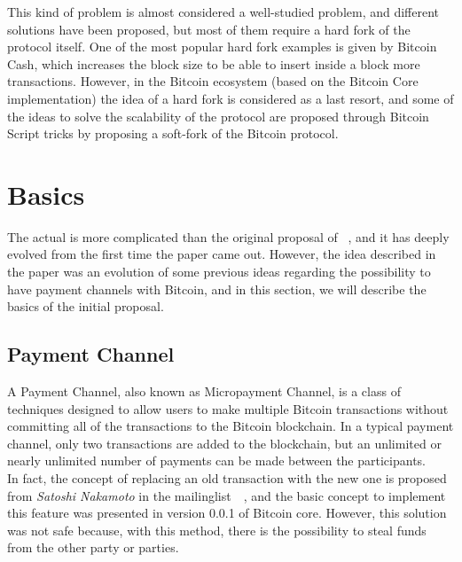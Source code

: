 This kind of problem is almost considered a well-studied problem, and different solutions have been proposed, but most of them require a hard fork of the protocol itself.
One of the most popular hard fork examples is given by Bitcoin Cash, which 
increases the block size to be able to insert inside a block more transactions.
However, in the Bitcoin ecosystem (based on the Bitcoin Core implementation) the idea of a hard fork is considered 
as a last resort, and some of the ideas to solve the scalability of the protocol are proposed through 
Bitcoin Script tricks by proposing a soft-fork of the Bitcoin protocol.

\section{{\LN} Basics}

The actual {\LN} is more complicated than the original proposal of  ~\cite{lightning-network-paper}, and it has deeply
evolved from the first time the paper came out. However, the idea described in the paper was an evolution
of some previous ideas regarding the possibility to have payment channels with Bitcoin, and in this section, we will describe the basics of the initial proposal.

\subsection{Payment Channel}

A Payment Channel, also known as Micropayment Channel, is a class of techniques designed to allow users to make multiple
Bitcoin transactions without committing all of the transactions to the Bitcoin blockchain. In a typical payment channel,
only two transactions are added to the blockchain, but an unlimited or nearly unlimited number of payments
can be made between the participants.\\
In fact, the concept of replacing an old transaction with the new one is proposed from \emph{Satoshi Nakamoto}
in the mailinglist~~\cite{payment-channels-satoshi}, and
the basic concept to implement this feature was presented in version 0.0.1 of Bitcoin core. However, this solution
was not safe because, with this method, there is the possibility to steal funds from the other party or parties.\\

